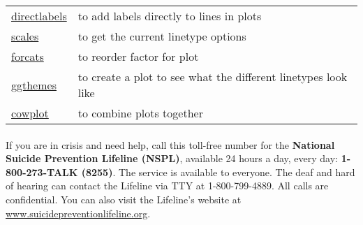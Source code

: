 \documentclass[
]{article}
\begin{document}
\begin{longtable}[]{@{}ll@{}}
\begin{minipage}[t]{0.41\columnwidth}
\href{http://directlabels.r-forge.r-project.org/docs/index.html}{directlabels}\strut
\end{minipage} & \begin{minipage}[t]{0.53\columnwidth}\raggedright
to add labels directly to lines in plots\strut
\end{minipage}\tabularnewline
\begin{minipage}[t]{0.41\columnwidth}\raggedright
\href{https://cran.r-project.org/web/packages/scales/scales.pdf}{scales}\strut
\end{minipage} & \begin{minipage}[t]{0.53\columnwidth}\raggedright
to get the current linetype options\strut
\end{minipage}\tabularnewline
\begin{minipage}[t]{0.41\columnwidth}\raggedright
\href{https://forcats.tidyverse.org/}{forcats}\strut
\end{minipage} & \begin{minipage}[t]{0.53\columnwidth}\raggedright
to reorder factor for plot\strut
\end{minipage}\tabularnewline
\begin{minipage}[t]{0.41\columnwidth}\raggedright
\href{https://cran.r-project.org/web/packages/ggthemes/ggthemes.pdf}{ggthemes}\strut
\end{minipage} & \begin{minipage}[t]{0.53\columnwidth}\raggedright
to create a plot to see what the different linetypes look like\strut
\end{minipage}\tabularnewline
\begin{minipage}[t]{0.41\columnwidth}\raggedright
\href{https://cran.r-project.org/web/packages/cowplot/vignettes/introduction.html}{cowplot}\strut
\end{minipage} & \begin{minipage}[t]{0.53\columnwidth}\raggedright
to combine plots together\strut
\end{minipage}\tabularnewline
\bottomrule
\end{longtable}

\hypertarget{section-54}{%
\paragraph{}\label{section-54}}

If you are in crisis and need help, call this toll-free number for the
\textbf{National Suicide Prevention Lifeline (NSPL)}, available 24 hours
a day, every day: \textbf{1-800-273-TALK (8255)}. The service is
available to everyone. The deaf and hard of hearing can contact the
Lifeline via TTY at 1-800-799-4889. All calls are confidential. You can
also visit the Lifeline's website at
\url{www.suicidepreventionlifeline.org}.
\end{document}
